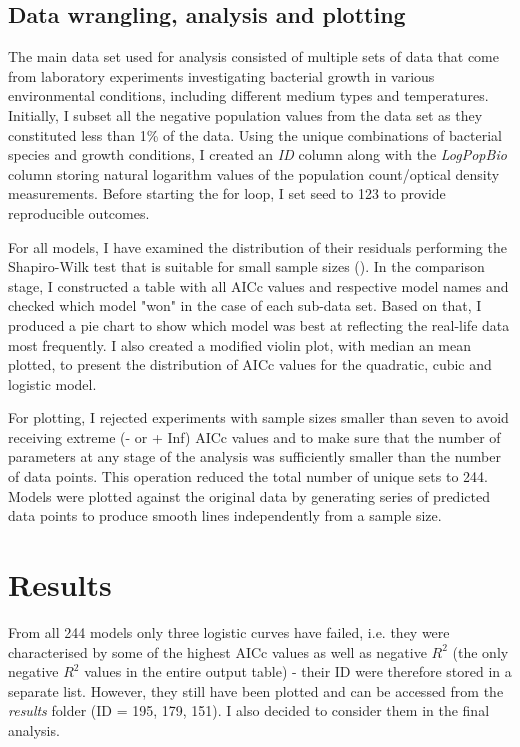 \documentclass[a4paper,11pt]{article}
\begin{document}
\subsection{Data wrangling, analysis and plotting}

The main data set used for analysis consisted of multiple sets of data that come from laboratory experiments investigating bacterial growth in various environmental conditions, including different medium types and temperatures. Initially, I subset all the negative population values from the data set as they constituted less than 1\% of the data. Using the unique combinations of bacterial species and growth conditions, I created an \emph{ID} column along with the \emph{LogPopBio} column storing natural logarithm values of the population count/optical density measurements. Before starting the for loop, I set seed to 123 to provide reproducible outcomes.

For all models, I have examined the distribution of their residuals performing the Shapiro-Wilk test that is suitable for small sample sizes (\cite{mishra2019descriptive}). In the comparison stage, I constructed a table with all AICc values and respective model names and checked which model "won" in the case of each sub-data set. Based on that, I produced a pie chart to show which model was best at reflecting the real-life data most frequently. I also created a modified violin plot, with median an mean plotted, to present the distribution of AICc values for the quadratic, cubic and logistic model. 

For plotting, I rejected experiments with sample sizes smaller than seven to avoid receiving extreme (- or + Inf) AICc values and to make sure that the number of parameters at any stage of the analysis was sufficiently smaller than the number of data points. This operation reduced the total number of unique sets to 244.
Models were plotted against the original data by generating series of predicted data points to produce smooth lines independently from a sample size.

    \section{Results}
    
From all 244 models only three logistic curves have failed, i.e. they were characterised by some of the highest AICc values as well as negative $R^{2}$ (the only negative $R^{2}$ values in the entire output table) - their ID were therefore stored in a separate list. However, they still have been plotted and can be accessed from the \textit{results} folder (ID = 195, 179, 151). I also decided to consider them in the final analysis.\par 
\end{document}
